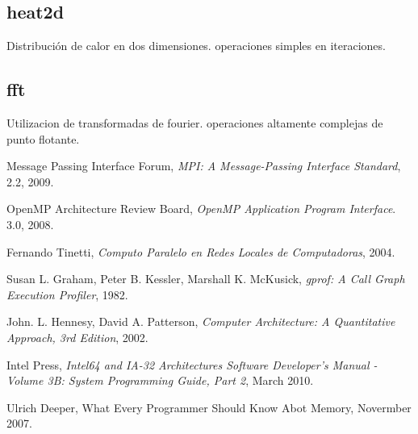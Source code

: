 \documentclass[a4paper,twocolumn]{article}
\begin{document}
\subsection{heat2d}

Distribuci\'on de calor en dos dimensiones.
operaciones simples en iteraciones.

\subsection{fft}

Utilizacion de transformadas de fourier.
operaciones altamente complejas de punto flotante.

\begin{thebibliography}{9}
  
  Message Passing Interface Forum,
  \emph{MPI: A Message-Passing Interface Standard},
  2.2,
  2009.

  OpenMP Architecture Review Board,
  \emph{OpenMP Application Program Interface}.
  3.0,
  2008.

  Fernando Tinetti,
  \emph{Computo Paralelo en Redes Locales de Computadoras},
  2004.

Susan L. Graham,  Peter B. Kessler,  Marshall K. McKusick,
\emph{gprof: A Call Graph Execution Profiler},
1982.

John. L. Hennesy, David A. Patterson,
\emph{Computer Architecture: A Quantitative Approach, 3rd Edition},
2002.

Intel Press,
\emph{Intel64 and IA-32 Architectures Software Developer's Manual - Volume 3B: System Programming Guide, Part 2},
March 2010.

Ulrich Deeper,
What Every Programmer Should Know Abot Memory,
Novermber 2007.

\end{thebibliography}
\end{document}
